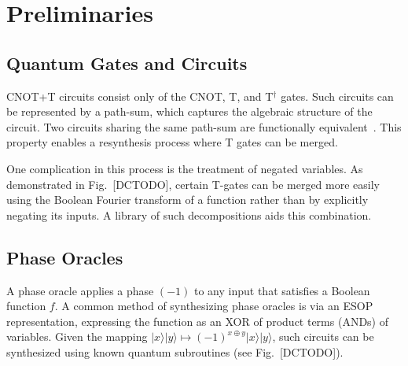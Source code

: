 \section{Preliminaries}

\subsection{Quantum Gates and Circuits}
CNOT+T circuits consist only of the CNOT, T, and T$^\dagger$ gates. Such circuits can be represented by a path-sum, which captures the algebraic structure of the circuit. Two circuits sharing the same path-sum are functionally equivalent~\cite{pathsum2018}. This property enables a resynthesis process where T gates can be merged.

One complication in this process is the treatment of negated variables. As demonstrated in Fig.~[DCTODO], certain T-gates can be merged more easily using the Boolean Fourier transform of a function rather than by explicitly negating its inputs. A library of such decompositions aids this combination.

\subsection{Phase Oracles}
A phase oracle applies a phase $(-1)$ to any input that satisfies a Boolean function $f$. A common method of synthesizing phase oracles is via an ESOP representation, expressing the function as an XOR of product terms (ANDs) of variables. Given the mapping $|x\rangle|y\rangle \mapsto (-1)^{x \oplus y}|x\rangle|y\rangle$, such circuits can be synthesized using known quantum subroutines (see Fig.~[DCTODO]).
